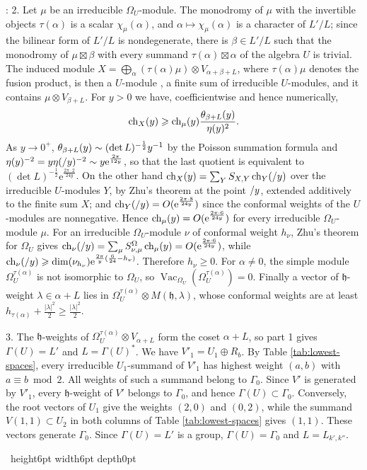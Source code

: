 \documentclass[leqno]{article}
\renewcommand{\geq}{\ensuremath{\geqslant}}
\newcommand{\qed}{\hfill \vrule height6pt  width6pt depth0pt}
\newcommand{\ot}{\otimes}
\let\i\relax
\newcommand{\i}{\mathrm{i}}
\newcommand{\e}{\mathrm{e}}
\newenvironment{proof}[1][]{\noindent {\it Proof #1} : }{\hbox{~}\qed
\smallskip
}
\numberwithin{equation}{section}
\begin{document}
\begin{proof}
2. Let $\mu$ be an irreducible $\Omega_U$-module. The monodromy of $\mu$ with the invertible objects $\tau(\alpha)$ is a scalar $\chi_\mu(\alpha)$, and $\alpha \mapsto \chi_\mu(\alpha)$ is a character of $L'/L$; since the bilinear form of $L'/L$ is nondegenerate, there is $\beta \in L'/L$ such that the monodromy of $\mu \boxtimes \beta$ with every summand $\tau(\alpha) \boxtimes \alpha$ of the algebra $U$ is trivial. The induced module $X = \bigoplus_\alpha (\tau(\alpha)\mu) \ot V_{\alpha+\beta+L}$, where $\tau(\alpha)\mu$ denotes the fusion product, is then a $U$-module \cite{HKL15,CKM22}, a finite sum of irreducible $U$-modules, and it contains $\mu \ot V_{\beta+L}$. For $y > 0$ we have, coefficientwise and hence numerically,
\[
\operatorname{ch}_X(\i y) \geq \operatorname{ch}_\mu(\i y)\frac{\theta_{\beta+L}(\i y)}{\eta(\i y)^2}.
\]
As $y \to 0^+$, $\theta_{\beta+L}(\i y) \sim (\det L)^{-\frac12}y^{-1}$ by the Poisson summation formula and $\eta(\i y)^{-2} = y\eta(\i/y)^{-2} \sim y\e^{\frac{2\pi}{12y}}$, so that the last quotient is equivalent to $(\det L)^{-\frac12}\e^{\frac{2\pi\cdot2}{24y}}$. On the other hand $\operatorname{ch}_X(\i y) = \sum_Y S_{X,Y}\operatorname{ch}_Y(\i/y)$ over the irreducible $U$-modules $Y$, by Zhu's theorem \cite{Zhu96} at the point $\i/y$, extended additively to the finite sum $X$; and $\operatorname{ch}_Y(\i/y) = O(\e^{\frac{2\pi\cdot8}{24y}})$ since the conformal weights of the $U$-modules are nonnegative. Hence $\operatorname{ch}_\mu(\i y) = O(\e^{\frac{2\pi\cdot6}{24y}})$ for every irreducible $\Omega_U$-module $\mu$. For an irreducible $\Omega_U$-module $\nu$ of conformal weight $h_\nu$, Zhu's theorem for $\Omega_U$ gives $\operatorname{ch}_\nu(\i/y) = \sum_\mu S^{\Omega}_{\nu,\mu}\operatorname{ch}_\mu(\i y) = O(\e^{\frac{2\pi\cdot6}{24y}})$, while $\operatorname{ch}_\nu(\i/y) \geq \dim(\nu_{h_\nu})\e^{\frac{2\pi}{y}(\frac6{24}-h_\nu)}$. Therefore $h_\nu \geq 0$. For $\alpha \neq 0$, the simple module $\Omega_U^{\tau(\alpha)}$ is not isomorphic to $\Omega_U$, so $\operatorname{Vac}_{\Omega_U}(\Omega_U^{\tau(\alpha)}) = 0$. Finally a vector of $\mathfrak h$-weight $\lambda \in \alpha+L$ lies in $\Omega_U^{\tau(\alpha)} \ot M(\mathfrak h,\lambda)$, whose conformal weights are at least $h_{\tau(\alpha)}+\frac{|\lambda|^2}2 \geq \frac{|\lambda|^2}2$.

3. The $\mathfrak h$-weights of $\Omega_U^{\tau(\alpha)} \ot V_{\alpha+L}$ form the coset $\alpha+L$, so part 1 gives $\Gamma(U) = L'$ and $L = \Gamma(U)^*$. We have $V'_1 = U_1 \oplus R_b$. By Table \ref{tab:lowest-spaces}, every irreducible $U_1$-summand of $V'_1$ has highest weight $(a,b)$ with $a \equiv b \bmod 2$. All weights of such a summand belong to $\Gamma_0$. Since $V'$ is generated by $V'_1$, every $\mathfrak h$-weight of $V'$ belongs to $\Gamma_0$, and hence $\Gamma(U) \subset \Gamma_0$. Conversely, the root vectors of $U_1$ give the weights $(2,0)$ and $(0,2)$, while the summand $V(1,1) \subset U_2$ in both columns of Table \ref{tab:lowest-spaces} gives $(1,1)$. These vectors generate $\Gamma_0$. Since $\Gamma(U) = L'$ is a group, $\Gamma(U) = \Gamma_0$ and $L = L_{k',k''}$.


\end{proof}
\end{document}

